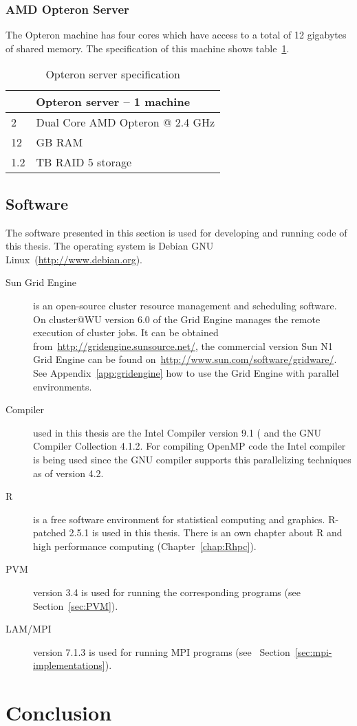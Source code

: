 \subsubsection{AMD Opteron Server}
The Opteron machine has four cores which
have access to a total of 12 gigabytes of shared memory. The
specification of this machine shows table~\ref{tab:opteronserver}.

\begin{table}[h!b!p!]
\centering
\caption{Opteron server specification}
\label{tab:opteronserver}
\begin{tabular}{|l|l|}
\hline
\multicolumn{2}{|c|}{\textbf{Opteron server -- 1 machine}}\\
\hline
2  & Dual Core AMD Opteron @ 2.4 GHz\\
12 & GB RAM\\
1.2& TB RAID 5 storage\\
\hline
\end{tabular}
\end{table}

\subsection{Software}

The software presented in this section is used for developing and
running code of this thesis. The operating system is Debian GNU
Linux~(\url{http://www.debian.org}).
 
\begin{description}
\item[Sun Grid Engine] is an open-source cluster resource management
  and scheduling software. On cluster@WU version 6.0 of the Grid
  Engine manages the remote execution of cluster jobs. It can be obtained
  from~\url{http://gridengine.sunsource.net/}, the commercial version
  Sun N1 Grid Engine can be found
  on~\url{http://www.sun.com/software/gridware/}. See
  Appendix~\ref{app:gridengine} how to use the Grid Engine with
  parallel environments.
\item[Compiler] used in this thesis are the Intel Compiler version 9.1 (
  and the GNU Compiler Collection 4.1.2. For compiling OpenMP code the
  Intel compiler is being used since the GNU compiler supports this
  parallelizing techniques as of version 4.2.
\item[R] is a free software environment for statistical computing and
  graphics. R-patched 2.5.1 is used in this thesis. There is an own
  chapter about R and high performance computing (Chapter~\ref{chap:Rhpc}).
\item[PVM] version 3.4 is used for running the corresponding programs
  (see Section~\ref{sec:PVM}).
\item[LAM/MPI] version 7.1.3 is used for running MPI programs (see~
  Section~\ref{sec:mpi-implementations}). 
\end{description}

\section{Conclusion}

